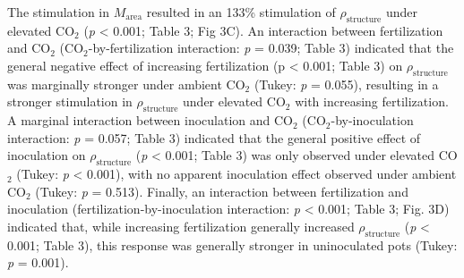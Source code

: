 The stimulation in $M_\mathrm{area}$ resulted in an 133\% stimulation of $\rho_\mathrm{structure}$ under elevated CO$_2$ (\textit{p} < 0.001; Table 3; Fig 3C). An interaction between fertilization and CO$_2$ (CO$_2$-by-fertilization interaction: \textit{p} = 0.039; Table 3) indicated that the general negative effect of increasing fertilization (p < 0.001; Table 3) on $\rho_\mathrm{structure}$ was marginally stronger under ambient CO$_2$ (Tukey: \textit{p} = 0.055), resulting in a stronger stimulation in $\rho_\mathrm{structure}$ under elevated CO$_2$ with increasing fertilization. A marginal interaction between inoculation and CO$_2$ (CO$_2$-by-inoculation interaction: \textit{p} = 0.057; Table 3) indicated that the general positive effect of inoculation on $\rho_\mathrm{structure}$ (\textit{p} < 0.001; Table 3) was only observed under elevated CO$_2$ (Tukey: \textit{p} < 0.001), with no apparent inoculation effect observed under ambient CO$_2$ (Tukey: \textit{p} = 0.513). Finally, an interaction between fertilization and inoculation (fertilization-by-inoculation interaction: \textit{p} < 0.001; Table 3; Fig. 3D) indicated that, while increasing fertilization generally increased $\rho_\mathrm{structure}$ (\textit{p} < 0.001; Table 3), this response was generally stronger in uninoculated pots (Tukey: \textit{p} = 0.001).

